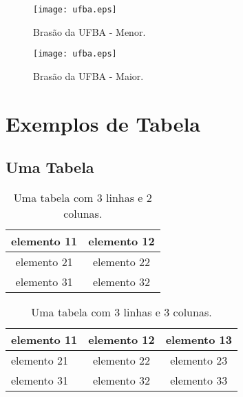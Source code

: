 \documentclass[bsc, classic, a4paper]{ufbathesis}
\begin{document}
\begin{figure}[htbp]
\begin{center}
  \texttt{[image: ufba.eps]}
\caption{Bras\~{a}o da UFBA - Menor.}
\label{default-regular1}
\end{center}
\end{figure}

\begin{figure}[htbp]
\begin{center}
  \texttt{[image: ufba.eps]}
\caption{Bras\~{a}o da UFBA - Maior.}
\label{default-regular2}
\end{center}
\end{figure}

\lipsum

\section{Exemplos de Tabela}
\subsection{Uma Tabela}
\begin{table}[htbp]
\caption{Uma tabela com 3 linhas e 2 colunas.}
\begin{center}
\begin{tabular}{|c|c|} 
\hline
elemento 11 & elemento 12 \\ \hline
elemento 21 & elemento 22 \\ \hline
elemento 31 & elemento 32 \\
\hline
\end{tabular}
\end{center}
\label{default-table1}
\end{table}%

\lipsum

\begin{table}[htbp]
\caption{Uma tabela com 3 linhas e 3 colunas.}
\begin{center}
\begin{tabular}{|l|c|c|} 
\hline
elemento 11 & elemento 12 & elemento 13\\ \hline
elemento 21 & elemento 22 & elemento 23\\ \hline
elemento 31 & elemento 32 & elemento 33\\
\hline
\end{tabular}
\end{center}
\label{default-table2}
\end{table}%
\end{document}
